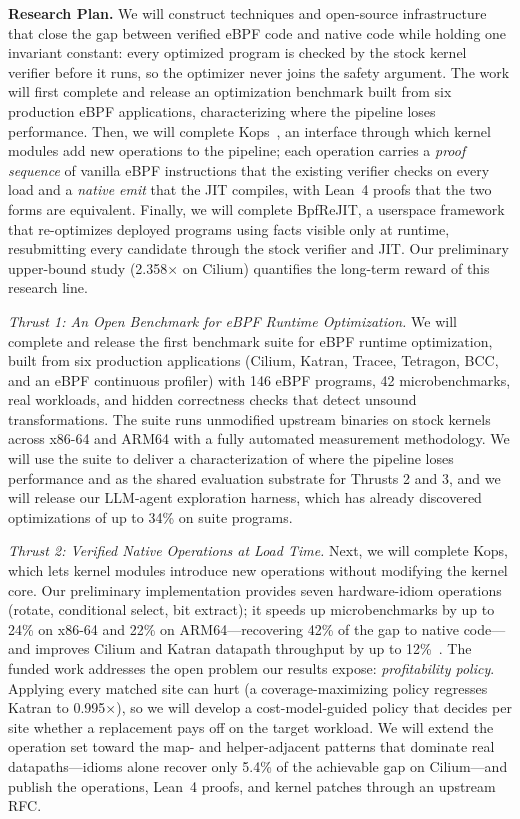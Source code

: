 \noindent \textbf{Research Plan.}  We will construct techniques and open-source infrastructure that close the gap between verified eBPF code and native code while holding one invariant constant: every optimized program is checked by the stock kernel verifier before it runs, so the optimizer never joins the safety argument.  The work will first complete and release an optimization benchmark built from six production eBPF applications, characterizing where the pipeline loses performance.  Then, we will complete Kops~\cite{zheng2026kops}, an interface through which kernel modules add new operations to the pipeline; each operation carries a \textit{proof sequence} of vanilla eBPF instructions that the existing verifier checks on every load and a \textit{native emit} that the JIT compiles, with Lean~4 proofs that the two forms are equivalent.  Finally, we will complete BpfReJIT, a userspace framework that re-optimizes deployed programs using facts visible only at runtime, resubmitting every candidate through the stock verifier and JIT.  Our preliminary upper-bound study (2.358$\times$ on Cilium) quantifies the long-term reward of this research line.

\textit{Thrust 1: An Open Benchmark for eBPF Runtime Optimization.}
We will complete and release the first benchmark suite for eBPF runtime optimization, built from six production applications (Cilium, Katran, Tracee, Tetragon, BCC, and an eBPF continuous profiler) with 146 eBPF programs, 42 microbenchmarks, real workloads, and hidden correctness checks that detect unsound transformations.  The suite runs unmodified upstream binaries on stock kernels across x86-64 and ARM64 with a fully automated measurement methodology.  We will use the suite to deliver a characterization of where the pipeline loses performance and as the shared evaluation substrate for Thrusts 2 and 3, and we will release our LLM-agent exploration harness, which has already discovered optimizations of up to 34\% on suite programs.

\textit{Thrust 2: Verified Native Operations at Load Time.}
Next, we will complete Kops, which lets kernel modules introduce new operations without modifying the kernel core.  Our preliminary implementation provides seven hardware-idiom operations (\eg rotate, conditional select, bit extract); it speeds up microbenchmarks by up to 24\% on x86-64 and 22\% on ARM64---recovering 42\% of the gap to native code---and improves Cilium and Katran datapath throughput by up to 12\%~\cite{zheng2026kops}.  The funded work addresses the open problem our results expose: \textit{profitability policy}.  Applying every matched site can hurt (a coverage-maximizing policy regresses Katran to 0.995$\times$), so we will develop a cost-model-guided policy that decides per site whether a replacement pays off on the target workload.  We will extend the operation set toward the map- and helper-adjacent patterns that dominate real datapaths---idioms alone recover only 5.4\% of the achievable gap on Cilium---and publish the operations, Lean~4 proofs, and kernel patches through an upstream RFC.

